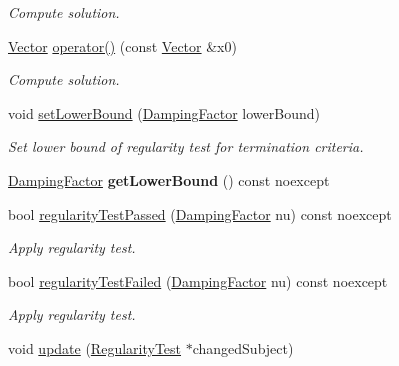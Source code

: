 \begin{DoxyCompactItemize}
\begin{DoxyCompactList}\small\item\em \-Compute solution. \end{DoxyCompactList}\item 
\hyperlink{classSpacy_1_1Vector}{\-Vector} \hyperlink{classSpacy_1_1CompositeStep_1_1AffineCovariantSolver_ae08612c2a1ca88d9a3746766bd5c1035}{operator()} (const \hyperlink{classSpacy_1_1Vector}{\-Vector} \&x0)
\begin{DoxyCompactList}\small\item\em \-Compute solution. \end{DoxyCompactList}\item 
\hypertarget{classSpacy_1_1Mixin_1_1RegularityTest_a682ce022b0b5493e48f50f693ed64082}{void \hyperlink{classSpacy_1_1Mixin_1_1RegularityTest_a682ce022b0b5493e48f50f693ed64082}{set\-Lower\-Bound} (\hyperlink{classSpacy_1_1DampingFactor}{\-Damping\-Factor} lower\-Bound)}\label{classSpacy_1_1Mixin_1_1RegularityTest_a682ce022b0b5493e48f50f693ed64082}

\begin{DoxyCompactList}\small\item\em \-Set lower bound of regularity test for termination criteria. \end{DoxyCompactList}\item 
\hypertarget{classSpacy_1_1Mixin_1_1RegularityTest_a576995201badbfaee2064bf0d7749257}{\hyperlink{classSpacy_1_1DampingFactor}{\-Damping\-Factor} {\bfseries get\-Lower\-Bound} () const noexcept}\label{classSpacy_1_1Mixin_1_1RegularityTest_a576995201badbfaee2064bf0d7749257}

\item 
bool \hyperlink{classSpacy_1_1Mixin_1_1RegularityTest_acb6b3e8c76ebdbded0ec610959513caf}{regularity\-Test\-Passed} (\hyperlink{classSpacy_1_1DampingFactor}{\-Damping\-Factor} nu) const noexcept
\begin{DoxyCompactList}\small\item\em \-Apply regularity test. \end{DoxyCompactList}\item 
bool \hyperlink{classSpacy_1_1Mixin_1_1RegularityTest_aeb1a3b051bafc9da9be1df354c652812}{regularity\-Test\-Failed} (\hyperlink{classSpacy_1_1DampingFactor}{\-Damping\-Factor} nu) const noexcept
\begin{DoxyCompactList}\small\item\em \-Apply regularity test. \end{DoxyCompactList}\item 
\hypertarget{classSpacy_1_1Mixin_1_1RegularityTest_a1a6191e20f84025cec8b10ec63ab94ac}{void \hyperlink{classSpacy_1_1Mixin_1_1RegularityTest_a1a6191e20f84025cec8b10ec63ab94ac}{update} (\hyperlink{classSpacy_1_1Mixin_1_1RegularityTest_a548d9d45c31c7833266bd3b20dc1aa7e}{\-Regularity\-Test} $\ast$changed\-Subject)}\label{classSpacy_1_1Mixin_1_1RegularityTest_a1a6191e20f84025cec8b10ec63ab94ac}


\end{DoxyCompactItemize}
